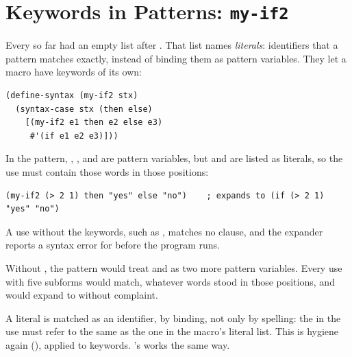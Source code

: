 \section{Keywords in Patterns: \texttt{my-if2}}
\label{sec:literals}

Every  so far had an empty list \code{()} after . That list names \emph{literals}: identifiers that a pattern matches exactly, instead of binding them as pattern variables. They let a macro have keywords of its own:
\begin{lstlisting}
(define-syntax (my-if2 stx)
  (syntax-case stx (then else)
    [(my-if2 e1 then e2 else e3)
     #'(if e1 e2 e3)]))
\end{lstlisting}
In the pattern, , , and  are pattern variables, but  and  are listed as literals, so the use must contain those words in those positions:
\begin{lstlisting}
(my-if2 (> 2 1) then "yes" else "no")    ; expands to (if (> 2 1) "yes" "no")
\end{lstlisting}
A use without the keywords, such as , matches no clause, and the expander reports a syntax error for  before the program runs.

\begin{pitfall}
Without , the pattern  would treat  and  as two more pattern variables. Every use with five subforms would match, whatever words stood in those positions, and  would expand to  without complaint.
\end{pitfall}

\begin{remark}
A literal is matched as an identifier, by binding, not only by spelling: the  in the use must refer to the same  as the one in the macro's literal list. This is hygiene again (), applied to keywords. 's  works the same way.
\end{remark}
